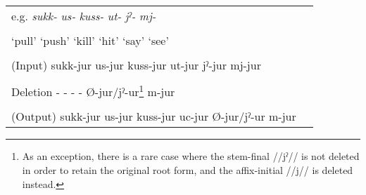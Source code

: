 \begin{table}
\begin{tabular}{ll}
e.g.  \textit{sukk-}  \textit{us-}  \textit{kuss-}  \textit{ut-}  \textit{jˀ-}  \textit{mj-}                                                                                                                                                                  \\
                                                                                                                                                                                                                                                              \\
  ‘pull’  ‘push’  ‘kill’  ‘hit’  ‘say’  ‘see’                                                                                                                                                                                                                 \\
                                                                                                                                                                                                                                                              \\
(Input)  sukk-jur  us-jur  kuss-jur  ut-jur  jˀ-jur  mj-jur                                                                                                                                                                                                   \\
                                                                                                                                                                                                                                                              \\
Deletion  -  -  -  -  Ø-jur/jˀ-ur\footnote{As an exception, there is a rare case where the stem-final //jˀ// is not deleted in order to retain the original root form, and the affix-initial //j// is deleted instead.}  m-jur                                \\
                                                                                                                                                                                                                                                              \\
(Output)  sukk-jur  us-jur  kuss-jur  uc-jur  Ø-jur/jˀ-ur  m-jur                                                                                                                                                                                              \\

\end{tabular}
\end{table}
